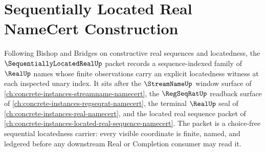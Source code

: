 \chapter{Sequentially Located Real NameCert Construction}
\label{ch:concrete-instances-sequentially-located-real-namecert}

Following Bishop and Bridges on constructive real sequences and locatedness, the $\SequentiallyLocatedRealUp$ packet records a sequence-indexed family of $\RealUp$ names whose finite observations carry an explicit locatedness witness at each inspected unary index. It sits after the $\StreamNameUp$ window surface of \autoref{ch:concrete-instances-streamname-namecert}, the $\RegSeqRatUp$ readback surface of \autoref{ch:concrete-instances-regseqrat-namecert}, the terminal $\RealUp$ seal of \autoref{ch:concrete-instances-real-namecert}, and the located real sequence packet of \autoref{ch:concrete-instances-located-real-sequence-namecert}. The packet is a choice-free sequential locatedness carrier: every visible coordinate is finite, named, and ledgered before any downstream Real or Completion consumer may read it.

